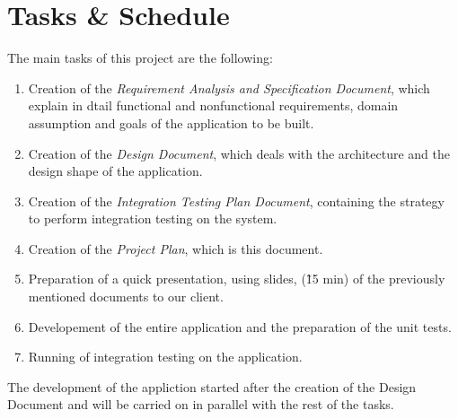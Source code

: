 \section{Tasks \& Schedule}

The main tasks of this project are the following:
\begin{enumerate}
    \item Creation of the \emph{Requirement Analysis and Specification Document}, which explain in dtail functional and nonfunctional requirements, domain assumption and goals of the application to be built.
    \item Creation of the \emph{Design Document}, which deals with the architecture and the design shape of the application.
    \item Creation of the \emph{Integration Testing Plan Document}, containing the strategy to perform integration testing on the system.
    \item Creation of the \emph{Project Plan}, which is this document.
    \item Preparation of a quick presentation, using slides, (\~15 min) of the previously mentioned documents to our client.
    \item Developement of the entire application and the preparation of the unit tests.
    \item Running of integration testing on the application.
\end{enumerate}

The development of the appliction started after the creation of the Design Document and will be carried on in parallel with the rest of the tasks.  

